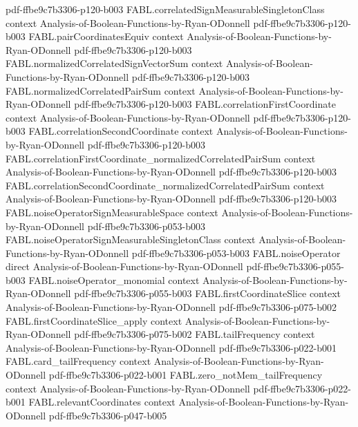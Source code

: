 \begin{theorem}
  {pdf-ffbe9c7b3306-p120-b003}
\proofstep
  {FABL.correlatedSignMeasurableSingletonClass}
  {context}
  {Analysis-of-Boolean-Functions-by-Ryan-ODonnell}
  {pdf-ffbe9c7b3306-p120-b003}
\proofstep
  {FABL.pairCoordinatesEquiv}
  {context}
  {Analysis-of-Boolean-Functions-by-Ryan-ODonnell}
  {pdf-ffbe9c7b3306-p120-b003}
\proofstep
  {FABL.normalizedCorrelatedSignVectorSum}
  {context}
  {Analysis-of-Boolean-Functions-by-Ryan-ODonnell}
  {pdf-ffbe9c7b3306-p120-b003}
\proofstep
  {FABL.normalizedCorrelatedPairSum}
  {context}
  {Analysis-of-Boolean-Functions-by-Ryan-ODonnell}
  {pdf-ffbe9c7b3306-p120-b003}
\proofstep
  {FABL.correlationFirstCoordinate}
  {context}
  {Analysis-of-Boolean-Functions-by-Ryan-ODonnell}
  {pdf-ffbe9c7b3306-p120-b003}
\proofstep
  {FABL.correlationSecondCoordinate}
  {context}
  {Analysis-of-Boolean-Functions-by-Ryan-ODonnell}
  {pdf-ffbe9c7b3306-p120-b003}
\proofstep
  {FABL.correlationFirstCoordinate_normalizedCorrelatedPairSum}
  {context}
  {Analysis-of-Boolean-Functions-by-Ryan-ODonnell}
  {pdf-ffbe9c7b3306-p120-b003}
\proofstep
  {FABL.correlationSecondCoordinate_normalizedCorrelatedPairSum}
  {context}
  {Analysis-of-Boolean-Functions-by-Ryan-ODonnell}
  {pdf-ffbe9c7b3306-p120-b003}
\proofstep
  {FABL.noiseOperatorSignMeasurableSpace}
  {context}
  {Analysis-of-Boolean-Functions-by-Ryan-ODonnell}
  {pdf-ffbe9c7b3306-p053-b003}
\proofstep
  {FABL.noiseOperatorSignMeasurableSingletonClass}
  {context}
  {Analysis-of-Boolean-Functions-by-Ryan-ODonnell}
  {pdf-ffbe9c7b3306-p053-b003}
\proofstep
  {FABL.noiseOperator}
  {direct}
  {Analysis-of-Boolean-Functions-by-Ryan-ODonnell}
  {pdf-ffbe9c7b3306-p055-b003}
\proofstep
  {FABL.noiseOperator_monomial}
  {context}
  {Analysis-of-Boolean-Functions-by-Ryan-ODonnell}
  {pdf-ffbe9c7b3306-p055-b003}
\proofstep
  {FABL.firstCoordinateSlice}
  {context}
  {Analysis-of-Boolean-Functions-by-Ryan-ODonnell}
  {pdf-ffbe9c7b3306-p075-b002}
\proofstep
  {FABL.firstCoordinateSlice_apply}
  {context}
  {Analysis-of-Boolean-Functions-by-Ryan-ODonnell}
  {pdf-ffbe9c7b3306-p075-b002}
\proofstep
  {FABL.tailFrequency}
  {context}
  {Analysis-of-Boolean-Functions-by-Ryan-ODonnell}
  {pdf-ffbe9c7b3306-p022-b001}
\proofstep
  {FABL.card_tailFrequency}
  {context}
  {Analysis-of-Boolean-Functions-by-Ryan-ODonnell}
  {pdf-ffbe9c7b3306-p022-b001}
\proofstep
  {FABL.zero_notMem_tailFrequency}
  {context}
  {Analysis-of-Boolean-Functions-by-Ryan-ODonnell}
  {pdf-ffbe9c7b3306-p022-b001}
\proofstep
  {FABL.relevantCoordinates}
  {context}
  {Analysis-of-Boolean-Functions-by-Ryan-ODonnell}
  {pdf-ffbe9c7b3306-p047-b005}

\end{theorem}
